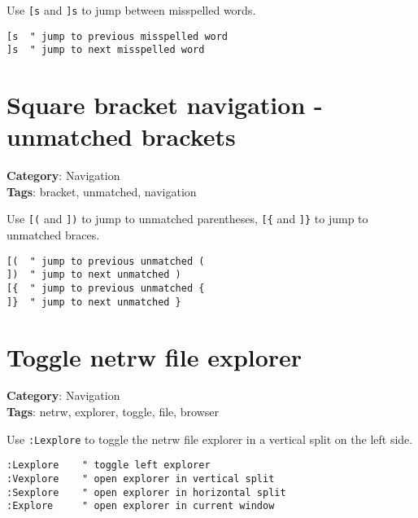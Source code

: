 {{{{{{{{{Use {\footnotesize \Verb§[s§} and {\footnotesize \Verb§]s§} to jump between misspelled words.

\begin{Exa*}{}
\begin{Verbatim}[fontsize=\footnotesize, breaklines, breakanywhere]
[s  " jump to previous misspelled word
]s  " jump to next misspelled word
\end{Verbatim}
\end{Exa*}

\section{Square bracket navigation - unmatched brackets}

\textbf{Category}: Navigation\\ \textbf{Tags}: bracket, unmatched, navigation
\vspace{0.5cm}

Use {\footnotesize \Verb§[(§} and {\footnotesize \Verb§])§} to jump to unmatched parentheses, {\footnotesize \Verb§[{§} and {\footnotesize \Verb§]}§} to jump to unmatched braces.

\begin{Exa*}{}
\begin{Verbatim}[fontsize=\footnotesize, breaklines, breakanywhere]
[(  " jump to previous unmatched (
])  " jump to next unmatched )
[{  " jump to previous unmatched {
]}  " jump to next unmatched }
\end{Verbatim}
\end{Exa*}

\section{Toggle netrw file explorer}

\textbf{Category}: Navigation\\ \textbf{Tags}: netrw, explorer, toggle, file, browser
\vspace{0.5cm}

Use {\footnotesize \Verb§:Lexplore§} to toggle the netrw file explorer in a vertical split on the left side.

\begin{Exa*}{}
\begin{Verbatim}[fontsize=\footnotesize, breaklines, breakanywhere]
:Lexplore    " toggle left explorer
:Vexplore    " open explorer in vertical split
:Sexplore    " open explorer in horizontal split
:Explore     " open explorer in current window
\end{Verbatim}
\end{Exa*}

}}}}}}}}}
